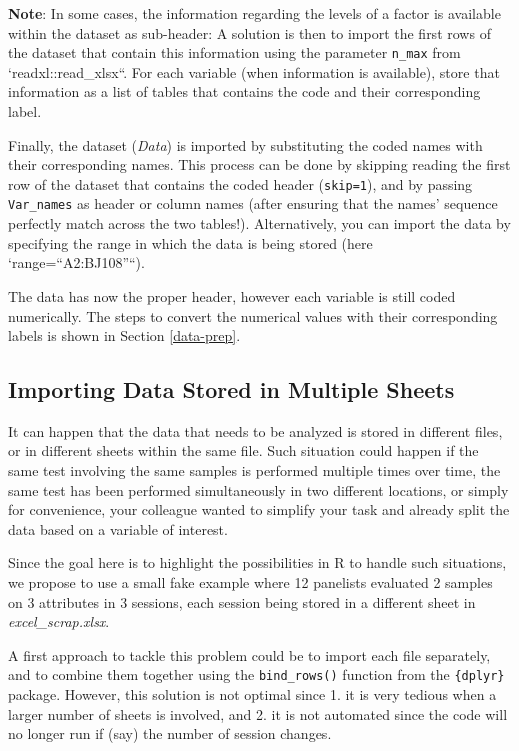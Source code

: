 \documentclass[
]{book}
\begin{document}
\textbf{Note}: In some cases, the information regarding the levels of a factor is available within the dataset as sub-header: A solution is then to import the first rows of the dataset that contain this information using the parameter \texttt{n\_max} from `readxl::read\_xlsx``. For each variable (when information is available), store that information as a list of tables that contains the code and their corresponding label.

Finally, the dataset (\emph{Data}) is imported by substituting the coded names with their corresponding names.
This process can be done by skipping reading the first row of the dataset that contains the coded header (\texttt{skip=1}), and by passing \texttt{Var\_names} as header or column names (after ensuring that the names' sequence perfectly match across the two tables!).
Alternatively, you can import the data by specifying the range in which the data is being stored (here `range=``A2:BJ108''``).

The data has now the proper header, however each variable is still coded numerically. The steps to convert the numerical values with their corresponding labels is shown in Section \ref{data-prep}.

\hypertarget{import-mult-sheet}{%
\subsection{Importing Data Stored in Multiple Sheets}\label{import-mult-sheet}}

It can happen that the data that needs to be analyzed is stored in different files, or in different sheets within the same file. Such situation could happen if the same test involving the same samples is performed multiple times over time, the same test has been performed simultaneously in two different locations, or simply for convenience, your colleague wanted to simplify your task and already split the data based on a variable of interest.

Since the goal here is to highlight the possibilities in R to handle such situations, we propose to use a small fake example where 12 panelists evaluated 2 samples on 3 attributes in 3 sessions, each session being stored in a different sheet in \emph{excel\_scrap.xlsx}.

A first approach to tackle this problem could be to import each file separately, and to combine them together using the \texttt{bind\_rows()} function from the \texttt{\{dplyr\}} package. However, this solution is not optimal since 1. it is very tedious when a larger number of sheets is involved, and 2. it is not automated since the code will no longer run if (say) the number of session changes.
\end{document}
